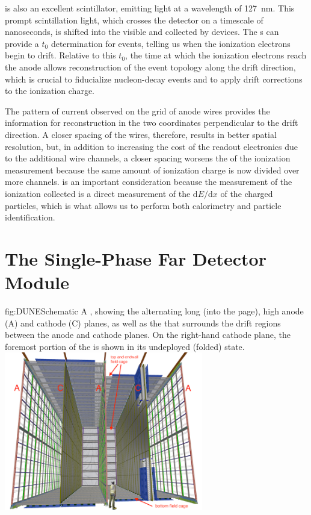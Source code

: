  is also an excellent scintillator, emitting  light at a wavelength of \SI{127}{\nano\meter}. This prompt scintillation light, which crosses the detector on a timescale of nanoseconds, is shifted into the visible and collected by  devices. The s can provide a $t_{0}$ determination for events, telling us when the ionization electrons begin to drift. Relative to this $t_{0}$, the time at which the ionization electrons reach the anode allows reconstruction of the event topology along the drift direction, which is crucial to fiducialize nucleon-decay events and to apply drift corrections to the ionization charge.

The pattern of current observed on the grid of anode wires provides the information for reconstruction in the two coordinates perpendicular to the drift direction. A closer spacing of the wires, therefore, results in better spatial resolution, but, in addition to increasing the cost of the readout electronics due to the additional wire channels, a closer spacing worsens the  of the ionization measurement because the same amount of ionization charge is now divided over more channels.  is an important consideration because the measurement of the ionization collected is a direct measurement of the $\mathrm{d}E/\mathrm{d}x$ of the charged particles, which is what allows us to perform both calorimetry and particle identification.

\section{The  Single-Phase Far Detector Module}
\label{sec:fdsp-exec-dunefd}

\begin{dunefigure}{fig:DUNESchematic}
{A \nominalmodsize {}  , showing the alternating \sptpclen{} long (into the page), \tpcheight{} high anode (A) and cathode (C) planes, as well as the  that surrounds the drift regions between the anode and cathode planes. On the right-hand cathode plane, the foremost portion of the  is shown in its undeployed (folded) state.}
\includegraphics[width=0.65\textwidth]{graphics/DUNESchematic.png}
\end{dunefigure}



